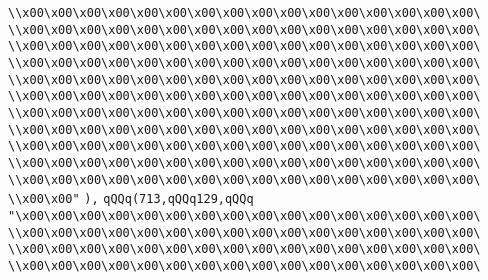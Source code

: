 \verb|\\x00\x00\x00\x00\x00\x00\x00\x00\x00\x00\x00\x00\x00\x00\x00\x00\|\newline
\verb|\\x00\x00\x00\x00\x00\x00\x00\x00\x00\x00\x00\x00\x00\x00\x00\x00\|\newline
\verb|\\x00\x00\x00\x00\x00\x00\x00\x00\x00\x00\x00\x00\x00\x00\x00\x00\|\newline
\verb|\\x00\x00\x00\x00\x00\x00\x00\x00\x00\x00\x00\x00\x00\x00\x00\x00\|\newline
\verb|\\x00\x00\x00\x00\x00\x00\x00\x00\x00\x00\x00\x00\x00\x00\x00\x00\|\newline
\verb|\\x00\x00\x00\x00\x00\x00\x00\x00\x00\x00\x00\x00\x00\x00\x00\x00\|\newline
\verb|\\x00\x00\x00\x00\x00\x00\x00\x00\x00\x00\x00\x00\x00\x00\x00\x00\|\newline
\verb|\\x00\x00\x00\x00\x00\x00\x00\x00\x00\x00\x00\x00\x00\x00\x00\x00\|\newline
\verb|\\x00\x00\x00\x00\x00\x00\x00\x00\x00\x00\x00\x00\x00\x00\x00\x00\|\newline
\verb|\\x00\x00\x00\x00\x00\x00\x00\x00\x00\x00\x00\x00\x00\x00\x00\x00\|\newline
\verb|\\x00\x00\x00\x00\x00\x00\x00\x00\x00\x00\x00\x00\x00\x00\x00\x00\|\newline
\verb|\\x00\x00"|\newline
\verb|),|\newline
\verb|qQQq(713,qQQq129,qQQq|\newline
\verb|"\x00\x00\x00\x00\x00\x00\x00\x00\x00\x00\x00\x00\x00\x00\x00\x00\|\newline
\verb|\\x00\x00\x00\x00\x00\x00\x00\x00\x00\x00\x00\x00\x00\x00\x00\x00\|\newline
\verb|\\x00\x00\x00\x00\x00\x00\x00\x00\x00\x00\x00\x00\x00\x00\x00\x00\|\newline
\verb|\\x00\x00\x00\x00\x00\x00\x00\x00\x00\x00\x00\x00\x00\x00\x00\x00\|\newline
